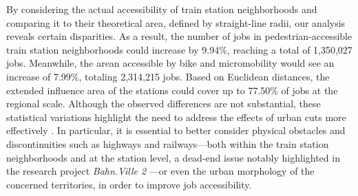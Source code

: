 \begin{refsegment}
By considering the actual accessibility of train station neighborhoods and comparing it to their theoretical area, defined by straight-line radii, our analysis reveals certain disparities. As a result, the number of jobs in pedestrian-accessible train station neighborhoods could increase by 9.94\%, reaching a total of 1,350,027 jobs. Meanwhile, the arean accessible by bike and micromobility would see an increase of 7.99\%, totaling 2,314,215 jobs. Based on Euclidean distances, the extended influence area of the stations could cover up to 77.50\% of jobs at the regional scale. Although the observed differences are not substantial, these statistical variations highlight the need to address the effects of urban cuts more effectively \textcolor{blue}{\autocite[4]{heran_zones_2009}}. In particular, it is essential to better consider physical obstacles and discontinuities such as highways and railways—both within the train station neighborhoods and at the station level, a dead-end issue notably highlighted in the research project \textsl{Bahn.Ville 2} \textcolor{blue}{\autocite[65-67]{lhostis_concevoir_2009}}—or even the urban morphology of the concerned territories, in order to improve job accessibility.%


\end{refsegment}

